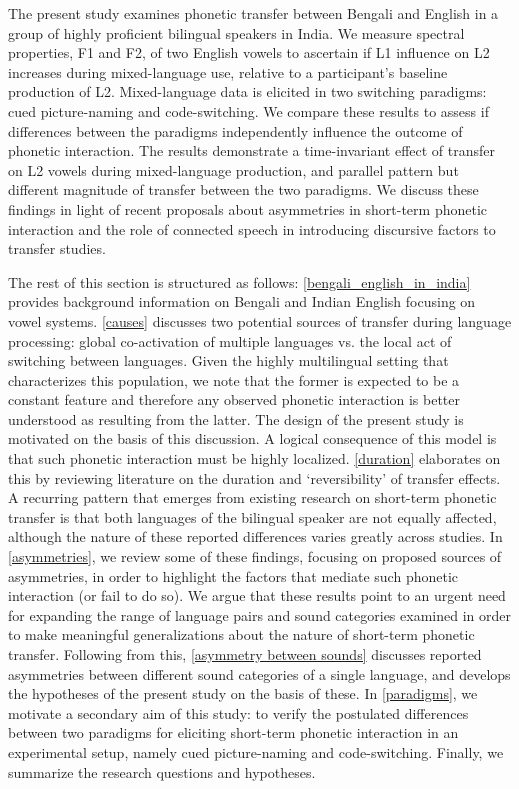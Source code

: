 \documentclass[12 pt]{article}
\begin{document}
The present study examines phonetic transfer between Bengali and English in a group of highly proficient bilingual speakers in India. We measure spectral properties, F1 and F2, of two English vowels to ascertain if L1 influence on L2 increases during mixed-language use, relative to a participant's baseline production of L2. Mixed-language data is elicited in two switching paradigms: cued picture-naming and code-switching. We compare these results to assess if differences between the paradigms independently influence the outcome of phonetic interaction. The results demonstrate a time-invariant effect of transfer on L2 vowels during mixed-language production, and parallel pattern but different magnitude of transfer between the two paradigms. We discuss these findings in light of recent proposals about asymmetries in short-term phonetic interaction and the role of connected speech in introducing discursive factors to transfer studies.


The rest of this section is structured as follows: \ref{bengali_english_in_india} provides background information on Bengali and Indian English focusing on vowel systems. \ref{causes} discusses two potential sources of transfer during language processing: global co-activation of multiple languages vs. the local act of switching between languages. Given the highly multilingual setting that characterizes this population, we note that the former is expected to be a constant feature and therefore any observed phonetic interaction is better understood as resulting from the latter. The design of the present study is motivated on the basis of this discussion. A logical consequence of this model is that such phonetic interaction must be highly localized. \ref{duration} elaborates on this by reviewing literature on the duration and `reversibility' of transfer effects. A recurring pattern that emerges from existing research on short-term phonetic transfer is that both languages of the bilingual speaker are not equally affected, although the nature of these reported differences varies greatly across studies. In \ref{asymmetries}, we review some of these findings, focusing on proposed sources of asymmetries, in order to highlight the factors that mediate such phonetic interaction (or fail to do so). We argue that these results point to an urgent need for expanding the range of language pairs and sound categories examined in order to make meaningful generalizations about the nature of short-term phonetic transfer. Following from this, \ref{asymmetry between sounds} discusses reported asymmetries between different sound categories of a single language, and develops the hypotheses of the present study on the basis of these. In \ref{paradigms}, we motivate a secondary aim of this study: to verify the postulated differences between two paradigms for eliciting short-term phonetic interaction in an experimental setup, namely cued picture-naming and code-switching. Finally, we summarize the research questions and hypotheses.
\end{document}
